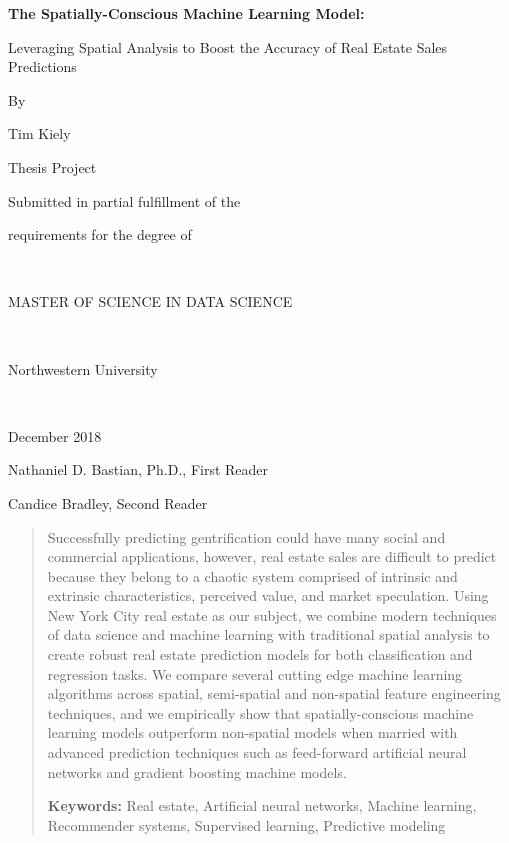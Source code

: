 \documentclass[12pt,]{article}
\title{}
\author{}
\date{}
\begin{document}

\titlepage
\center
\vspace{4 cm}
\normalsize

\bf 
The Spatially-Conscious Machine Learning Model:  

\normalsize

Leveraging Spatial Analysis to Boost the Accuracy of Real Estate Sales
Predictions

\rm
\normalsize

By

Tim Kiely

Thesis Project

Submitted in partial fulfillment of the

requirements for the degree of

~

MASTER OF SCIENCE IN DATA SCIENCE

~

Northwestern University

~

December 2018

Nathaniel D. Bastian, Ph.D., First Reader

Candice Bradley, Second Reader

\newpage
\normalsize
\singlespace
\begin{abstract}

Successfully predicting gentrification could have many social and commercial applications, however, real estate sales are difficult to predict because they belong to a chaotic system comprised of intrinsic and extrinsic characteristics, perceived value, and market speculation. Using New York City real estate as our subject, we combine modern techniques of data science and machine learning with traditional spatial analysis to create robust real estate prediction models for both classification and regression tasks. We compare several cutting edge machine learning algorithms across spatial, semi-spatial and non-spatial feature engineering techniques, and we empirically show that spatially-conscious machine learning models outperform non-spatial models when married with advanced prediction techniques such as feed-forward artificial neural networks and gradient boosting machine models. 

\textbf{Keywords:} Real estate, Artificial neural networks, Machine learning, Recommender systems, Supervised learning, Predictive modeling

\end{abstract}
\end{document}
